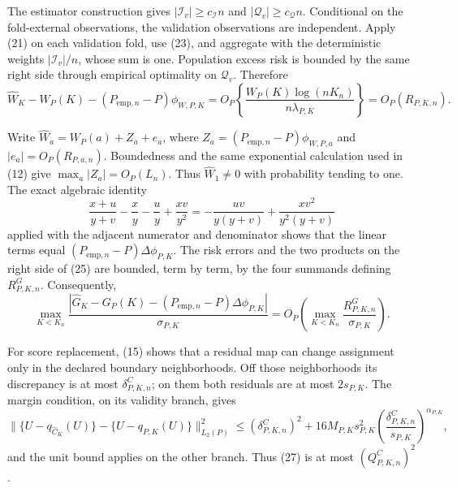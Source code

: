 The estimator construction gives \(|\mathcal I_v|\geq c_{\mathcal I}n\) and \(|\mathcal Q_v|\geq c_{\mathcal Q}n\).  Conditional on the fold-external observations, the validation observations are independent.  Apply (21) on each validation fold, use (23), and aggregate with the deterministic weights \(|\mathcal I_v|/n\), whose sum is one.  Population excess risk is bounded by the same right side through empirical optimality on \(\mathcal Q_v\).  Therefore
\[
 \widehat W_K-W_P(K)-(P_{\mathrm{emp},n}-P)\phi_{W,P,K}
 =O_P\!\left\{\frac{W_P(K)\log(nK_n)}{n\lambda_{P,K}}\right\}
 =O_P(R_{P,K,n}).                                                            \tag{24}
\]

Write \(\widehat W_a=W_P(a)+Z_a+e_a\), where \(Z_a=(P_{\mathrm{emp},n}-P)\phi_{W,P,a}\) and \(|e_a|=O_P(R_{P,a,n})\).  Boundedness and the same exponential calculation used in (12) give \(\max_a|Z_a|=O_P(L_n)\).  Thus \(\widehat W_1\neq0\) with probability tending to one.  The exact algebraic identity
\[
 \frac{x+u}{y+v}-\frac xy-\frac uy+\frac{xv}{y^2}
 =-\frac{uv}{y(y+v)}+\frac{xv^2}{y^2(y+v)}                                  \tag{25}
\]
applied with the adjacent numerator and denominator shows that the linear terms equal \((P_{\mathrm{emp},n}-P)\Delta\phi_{P,K}\).  The risk errors and the two products on the right side of (25) are bounded, term by term, by the four summands defining \(R^G_{P,K,n}\).  Consequently,
\[
 \max_{K<K_n}\frac{|\widehat G_K-G_P(K)
 -(P_{\mathrm{emp},n}-P)\Delta\phi_{P,K}|}{\sigma_{P,K}}
 =O_P\!\left(\max_{K<K_n}\frac{R^G_{P,K,n}}{\sigma_{P,K}}\right).          \tag{26}
\]

For score replacement, (15) shows that a residual map can change assignment only in the declared boundary neighborhoods.  Off those neighborhoods its discrepancy is at most \(\delta^C_{P,K,n}\); on them both residuals are at most \(2s_{P,K}\).  The margin condition, on its validity branch, gives
\[
 \|\{U-q_{\widehat C_K}(U)\}-\{U-q_{P,K}(U)\}\|_{L_2(P)}^2
 \leq(\delta^C_{P,K,n})^2
 +16M_{P,K}s_{P,K}^2
 \left(\frac{\delta^C_{P,K,n}}{s_{P,K}}\right)^{\alpha_{P,K}},             \tag{27}
\]
and the unit bound applies on the other branch.  Thus (27) is at most \((Q^C_{P,K,n})^2\).

